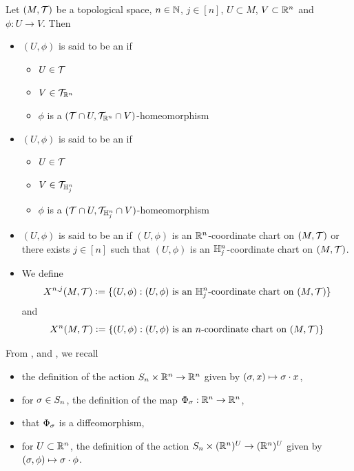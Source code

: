 \documentclass{book}
\begin{document}
	\begin{defn} 
		Let $(M, \mathcal{T})$ be a topological space, $n \in \mathbb{N}$, $j \in [n]$, $U \subset M$, $V \subset \mathbb{R}^n $ and $\phi:U \rightarrow V$. Then
		\begin{itemize}
			\item $(U, \phi)$ is said to be an  if 
			\begin{itemize}
				\item $U \in \mathcal{T}$ 
				\item $V \in \mathcal{T}_{\mathbb{R}^n}$ 
				\item $\phi$ is a $(\mathcal{T} \cap U, \mathcal{T}_{\mathbb{R}^n} \cap V)$-homeomorphism 
			\end{itemize}
			\item $(U, \phi)$ is said to be an  if 
			\begin{itemize}
				\item $U \in \mathcal{T}$ 
				\item $V \in \mathcal{T}_{\mathbb{H}^n_j}$ 
				\item $\phi$ is a $(\mathcal{T} \cap U, \mathcal{T}_{\mathbb{H}^n_j } \cap V)$-homeomorphism 
			\end{itemize}
			\item $(U, \phi)$ is said to be an  if $(U, \phi)$ is an $\mathbb{R}^n$-coordinate chart on $(M, \mathcal{T})$ or there exists $j \in [n]$ such that $(U, \phi)$ is an $\mathbb{H}^n_j$-coordinate chart on $(M, \mathcal{T})$.
			\item We define 
			$$X^{n,j}(M, \mathcal{T}) \vcentcolon= \{(U, \phi): (U, \phi) \text{ is an $\mathbb{H}^n_j$-coordinate chart on $(M, \mathcal{T})$} \}$$
			and 
			$$ X^n(M, \mathcal{T}) \vcentcolon= \{(U, \phi): (U, \phi) \text{ is an $n$-coordinate chart on $(M, \mathcal{T})$} \}$$
		\end{itemize}
	\end{defn}

	\begin{note}
		From ,  and , we recall 
		\begin{itemize}
			\item the definition of the action $S_n \times \mathbb{R}^n \rightarrow \mathbb{R}^n$ given by $(\sigma, x) \mapsto \sigma \cdot x$,
			\item for $\sigma \in S_n$, the definition of  the map $\Phi_{\sigma}: \mathbb{R}^n \rightarrow \mathbb{R}^n$,
			\item that $\Phi_{\sigma}$ is a diffeomorphism,
			\item for $U \subset \mathbb{R}^n$, the definition of the action $S_n \times (\mathbb{R}^n)^U \rightarrow (\mathbb{R}^n)^U$ given by $(\sigma, \phi) \mapsto \sigma \cdot \phi$.
		\end{itemize}
	\end{note}
\end{document}
